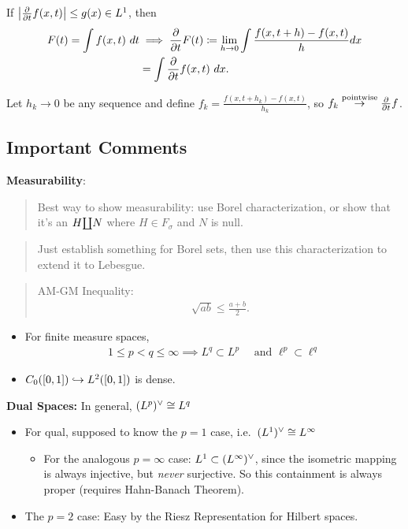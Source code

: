 If \({\left\lvert {{\frac{\partial }{\partial t}}f(x, t)} \right\rvert} \leq g(x) \in L^1\), then \begin{align*}
F(t) = \int f(x, t) ~dt 
&\implies {\frac{\partial }{\partial t}} F(t)\coloneqq \lim _{h \rightarrow 0} \int \frac{f(x, t+h)-f(x, t)}{h} d x \\
&= \int {\frac{\partial }{\partial t}} f(x, t) ~dx
.\end{align*}

Let \(h_k \to 0\) be any sequence and define
\(f_k = \frac{f(x, t+h_k)-f(x, t)}{h_k}\), so
\(f_k \overset{\text{pointwise}}\to {\frac{\partial }{\partial t}}f\).

\hypertarget{important-comments}{%
\subsection{Important Comments}\label{important-comments}}

\textbf{Measurability}:

\begin{quote}
Best way to show measurability: use Borel characterization, or show that
it's an \(H {\coprod} N\) where \(H \in F_\sigma\) and \(N\) is null.
\end{quote}

\begin{quote}
Just establish something for Borel sets, then use this characterization
to extend it to Lebesgue.
\end{quote}

\begin{quote}
AM-GM Inequality:
\begin{align*}
\sqrt{ab} \leq \frac{a+b}{2}
.\end{align*}
\end{quote}

\begin{itemize}
\item
  For finite measure spaces,
  \begin{align*}
  1 \leq p < q \leq \infty \implies L^q \subset L^p \quad \text{ and } \ell^p \subset \ell^q
  \end{align*}
\item
  \(C_0([0, 1]) \hookrightarrow L^2([0, 1])\) is dense.
\end{itemize}

\textbf{Dual Spaces:} In general, \((L^p)^\vee \cong L^q\)

\begin{itemize}
\tightlist
\item
  For qual, supposed to know the \(p=1\) case,
  i.e.~\((L^1)^\vee \cong L^\infty\)

  \begin{itemize}
  \tightlist
  \item
    For the analogous \(p=\infty\) case:
    \(L^1 \subset (L^\infty)^\vee\), since the isometric mapping is
    always injective, but \emph{never} surjective. So this containment
    is always proper (requires Hahn-Banach Theorem).
  \end{itemize}
\item
  The \(p=2\) case: Easy by the Riesz Representation for Hilbert spaces.
\end{itemize}

